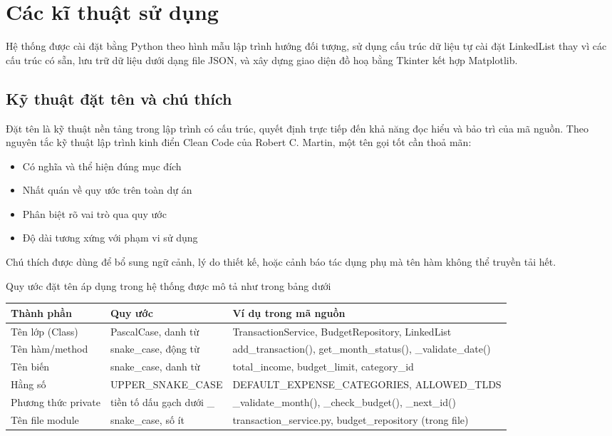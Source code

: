 \documentclass[12pt,letterpaper]{article}
\begin{document}
\newpage
\section{Các kĩ thuật sử dụng}
Hệ thống được cài đặt bằng Python theo hình mẫu lập trình hướng đối tượng, sử dụng cấu trúc dữ liệu tự cài đặt LinkedList thay vì các cấu trúc có sẵn, lưu trữ dữ liệu dưới dạng file JSON, và xây dựng giao diện đồ hoạ bằng Tkinter kết hợp Matplotlib.
\subsection{Kỹ thuật đặt tên và chú thích}
Đặt tên là kỹ thuật nền tảng trong lập trình có cấu trúc, quyết định trực tiếp đến khả năng đọc hiểu và bảo trì của mã nguồn. Theo nguyên tắc kỹ thuật lập trình kinh điển Clean Code của Robert C. Martin, một tên gọi tốt cần thoả mãn:

\begin{itemize}
    \item Có nghĩa và thể hiện đúng mục đích
    \item Nhất quán về quy ước trên toàn dự án
    \item Phân biệt rõ vai trò qua quy ước
    \item Độ dài tương xứng với phạm vi sử dụng
\end{itemize}

Chú thích được dùng để bổ sung ngữ cảnh, lý do thiết kế, hoặc cảnh báo tác dụng phụ mà tên hàm không thể truyền tải hết.

Quy ước đặt tên áp dụng trong hệ thống được mô tả như trong bảng dưới
\begin{table}[h!]
    \centering
    \renewcommand{\arraystretch}{1.4}
    \begin{tabular}{|p{3.5cm}|p{4.5cm}|p{7cm}|}
        \hline
        \textbf{Thành phần} & \textbf{Quy ước} & \textbf{Ví dụ trong mã nguồn} \\
        \hline
        Tên lớp (Class) & PascalCase, danh từ & TransactionService, BudgetRepository, LinkedList \\
        \hline
        Tên hàm/method & snake\_case, động từ & add\_transaction(), get\_month\_status(), \_validate\_date() \\
        \hline
        Tên biến & snake\_case, danh từ & total\_income, budget\_limit, category\_id \\
        \hline
        Hằng số & UPPER\_SNAKE\_CASE & DEFAULT\_EXPENSE\_CATEGORIES, ALLOWED\_TLDS \\
        \hline
        Phương thức private & tiền tố dấu gạch dưới \_ & \_validate\_month(), \_check\_budget(), \_next\_id() \\
        \hline
        Tên file module & snake\_case, số ít & transaction\_service.py, budget\_repository (trong file) \\
        \hline
    \end{tabular}
\end{table}
\end{document}
